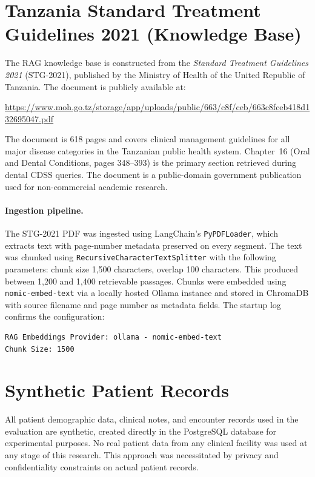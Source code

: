 \documentclass[12pt,a4paper]{report}
\begin{document}
\section{Tanzania Standard Treatment Guidelines 2021 (Knowledge Base)}

The RAG knowledge base is constructed from the \textit{Standard Treatment
Guidelines 2021} (STG-2021), published by the Ministry of Health of the United
Republic of Tanzania. The document is publicly available at:

\begin{center}
\url{https://www.moh.go.tz/storage/app/uploads/public/663/c8f/ceb/663c8fceb418d132695047.pdf}
\end{center}

The document is 618 pages and covers clinical management guidelines for all
major disease categories in the Tanzanian public health system. Chapter~16
(Oral and Dental Conditions, pages 348--393) is the primary section retrieved
during dental CDSS queries. The document is a public-domain government
publication used for non-commercial academic research.

\paragraph{Ingestion pipeline.}
The STG-2021 PDF was ingested using LangChain's \texttt{PyPDFLoader}, which
extracts text with page-number metadata preserved on every segment. The text
was chunked using \texttt{RecursiveCharacterTextSplitter} with the following
parameters: chunk size 1,500 characters, overlap 100 characters. This produced
between 1,200 and 1,400 retrievable passages. Chunks were embedded using
\texttt{nomic-embed-text} via a locally hosted Ollama instance and stored in
ChromaDB with source filename and page number as metadata fields. The startup
log confirms the configuration:

\begin{lstlisting}[basicstyle=\ttfamily\small]
RAG Embeddings Provider: ollama - nomic-embed-text
Chunk Size: 1500
\end{lstlisting}

\section{Synthetic Patient Records}

All patient demographic data, clinical notes, and encounter records used in
the evaluation are synthetic, created directly in the PostgreSQL database for
experimental purposes. No real patient data from any clinical facility was
used at any stage of this research. This approach was necessitated by privacy
and confidentiality constraints on actual patient records.
\end{document}
